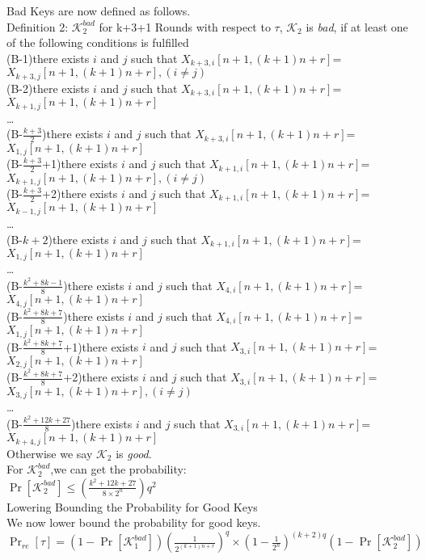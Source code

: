 \documentclass{article}
\begin{document}
Bad Keys are now defined as follows.\\
Definition 2: $\mathcal{K}_{2}^{bad}$  for k+3+1 Rounds
with respect to $\tau$, $\mathcal{K}_{2}$  is {\it bad}, if at least one of the following conditions is fulfilled\\
(B-1)there exists $i$ and $j$ such that $X_{k+3,i}[n+1,(k+1)n+r]$=$X_{k+3,j}[n+1,(k+1)n+r],(i\neq j)$\\
(B-2)there exists $i$ and $j$ such that $X_{k+3,i}[n+1,(k+1)n+r]$=$X_{k+1,j}[n+1,(k+1)n+r]$\\
\dots\\
(B-$\frac{k+3}{2}$)there exists $i$ and $j$ such that $X_{k+3,i}[n+1,(k+1)n+r]$=$X_{1,j}[n+1,(k+1)n+r]$\\
(B-$\frac{k+3}{2}$+1)there exists $i$ and $j$ such that $X_{k+1,i}[n+1,(k+1)n+r]$=$X_{k+1,j}[n+1,(k+1)n+r],(i\neq j)$\\
(B-$\frac{k+3}{2}$+2)there exists $i$ and $j$ such that $X_{k+1,i}[n+1,(k+1)n+r]$=$X_{k-1,j}[n+1,(k+1)n+r]$\\
\dots \\
(B-$k+2$)there exists $i$ and $j$ such that $X_{k+1,i}[n+1,(k+1)n+r]$=$X_{1,j}[n+1,(k+1)n+r]$\\
\dots \\
(B-$\frac{k^{2}+8k-1}{8}$)there exists $i$ and $j$ such that $X_{4,i}[n+1,(k+1)n+r]$=$X_{4,j}[n+1,(k+1)n+r]$\\
(B-$\frac{k^{2}+8k+7}{8}$)there exists $i$ and $j$ such that $X_{4,i}[n+1,(k+1)n+r]$=$X_{1,j}[n+1,(k+1)n+r]$\\
(B-$\frac{k^{2}+8k+7}{8}$+1)there exists $i$ and $j$ such that $X_{3,i}[n+1,(k+1)n+r]$=$X_{2,j}[n+1,(k+1)n+r]$\\
(B-$\frac{k^{2}+8k+7}{8}$+2)there exists $i$ and $j$ such that $X_{3,i}[n+1,(k+1)n+r]$=$X_{3,j}[n+1,(k+1)n+r],(i\neq j)$\\
\dots\\
(B-$\frac{k^{2}+12k+27}{8}$)there exists $i$ and $j$ such that $X_{3,i}[n+1,(k+1)n+r]$=$X_{k+4,j}[n+1,(k+1)n+r]$\\
Otherwise we say $\mathcal{K}_{2}$ is {\it good}.\\
For $\mathcal{K}_{2}^{bad}$,we can get the probability:\\
$\Pr[\mathcal{K}_{2}^{bad}]\leq (\frac{k^{2}+12k+27}{8\times2^{n}})q^{2}$\\

Lowering Bounding the Probability for Good Keys\\
We now lower bound the probability for good keys.\\
$\Pr_{re}[\tau]=(1-\Pr[\mathcal{K}_{1}^{bad}])(\frac{1}{2^{(k+1)n+r}})^{q}\times(1-\frac{1}{2^{n}})^{(k+2)q}
(1-\Pr[\mathcal{K}_{2}^{bad}])$
\end{document}
